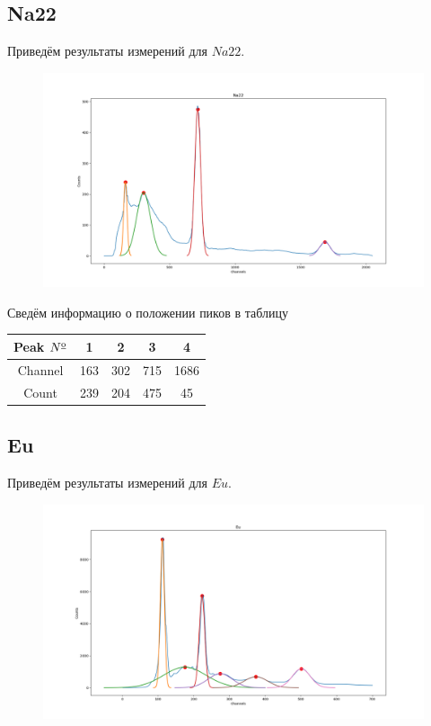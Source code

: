 \documentclass{article}
\begin{document}
\subsection{Na22}
Приведём результаты измерений для \(Na22\).

\begin{figure}[H]
	\includegraphics[width=\textwidth]{na22.png}
\end{figure}

Сведём информацию о положении пиков в таблицу

\begin{table}[H]
	\centering
	\begin{tabular}{|c|c|c|c|c|}
		\hline
		Peak \(N\textsuperscript{\underline{o}}\)& 1 & 2 & 3 & 4 \\\hline
		Channel & 163 & 302 & 715 & 1686 \\\hline
		Count   & 239 & 204 & 475 & 45 \\\hline
	\end{tabular}
\end{table}
\subsection{Eu}
Приведём результаты измерений для \(Eu\).

\begin{figure}[H]
	\includegraphics[width=\textwidth]{Eu.png}
\end{figure}
\end{document}
